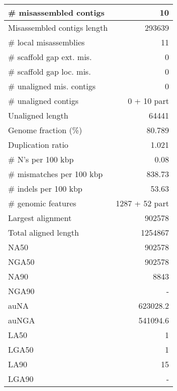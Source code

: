 \documentclass[12pt,a4paper]{article}
\begin{document}
\begin{table}[ht]
\begin{center}
\begin{tabular}{|l*{1}{|r}|}
\# misassembled contigs & 10 \\ \hline
Misassembled contigs length & 293639 \\ \hline
\# local misassemblies & 11 \\ \hline
\# scaffold gap ext. mis. & 0 \\ \hline
\# scaffold gap loc. mis. & 0 \\ \hline
\# unaligned mis. contigs & 0 \\ \hline
\# unaligned contigs & 0 + 10 part \\ \hline
Unaligned length & 64441 \\ \hline
Genome fraction (\%) & 80.789 \\ \hline
Duplication ratio & 1.021 \\ \hline
\# N's per 100 kbp & 0.08 \\ \hline
\# mismatches per 100 kbp & 838.73 \\ \hline
\# indels per 100 kbp & 53.63 \\ \hline
\# genomic features & 1287 + 52 part \\ \hline
Largest alignment & 902578 \\ \hline
Total aligned length & 1254867 \\ \hline
NA50 & 902578 \\ \hline
NGA50 & 902578 \\ \hline
NA90 & 8843 \\ \hline
NGA90 & - \\ \hline
auNA & 623028.2 \\ \hline
auNGA & 541094.6 \\ \hline
LA50 & 1 \\ \hline
LGA50 & 1 \\ \hline
LA90 & 15 \\ \hline
LGA90 & - \\ \hline
\end{tabular}
\end{center}
\end{table}
\end{document}

